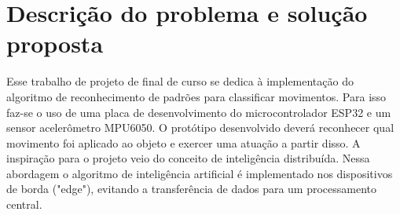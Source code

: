\section{Descrição do problema e solução proposta}

Esse trabalho de projeto de final de curso se dedica à implementação do algoritmo
 de reconhecimento de padrões para classificar movimentos.
Para isso faz-se o uso de uma placa de desenvolvimento do  microcontrolador ESP32 e um sensor 
acelerômetro MPU6050. O protótipo desenvolvido deverá reconhecer qual movimento foi aplicado
 ao objeto e exercer uma atuação a partir disso.
 A inspiração para o projeto veio do conceito de inteligência distribuída. Nessa abordagem o
 algoritmo de inteligência artificial é implementado nos dispositivos de borda ("edge"), evitando
 a transferência de dados para um processamento central.
